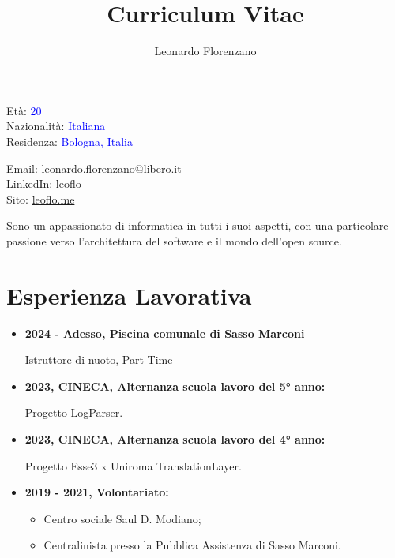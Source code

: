 \documentclass{paper}
\title{Curriculum Vitae}
\author{Leonardo Florenzano}
\begin{document}
\maketitle

\begin{multicols}{2}

\noindent
Età: \textcolor{blue}{20}\\
Nazionalità: \textcolor{blue}{Italiana}\\
Residenza: \textcolor{blue}{Bologna, Italia}

\columnbreak

\noindent
Email: \href{mailto:leonardo.florenzano@libero.it}{leonardo.florenzano@libero.it}\\
LinkedIn: \href{https://www.linkedin.com/in/leoflo}{leoflo}\\
Sito: \href{https://leoflo.me}{leoflo.me}

\end{multicols}

\noindent
Sono un appassionato di informatica in tutti i suoi aspetti, con una particolare passione verso l'architettura del software e il mondo dell'open source.

\section{Esperienza Lavorativa}

\begin{itemize}
    \item \textbf{2024 - Adesso, Piscina comunale di Sasso Marconi}

    Istruttore di nuoto, Part Time

    \item \textbf{2023, CINECA, Alternanza scuola lavoro del 5° anno:}

    Progetto LogParser.

    \item \textbf{2023, CINECA, Alternanza scuola lavoro del 4° anno:}

    Progetto Esse3 x Uniroma TranslationLayer.

    \item \textbf{2019 - 2021, Volontariato:}

    \begin{itemize}
        \item Centro sociale Saul D. Modiano;
        \item Centralinista presso la Pubblica Assistenza di Sasso Marconi.
    \end{itemize}
\end{itemize}
\end{document}
